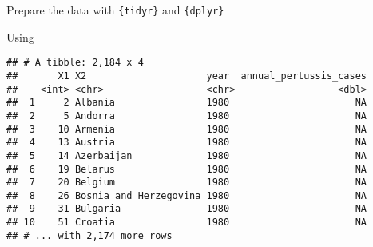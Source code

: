 \documentclass[ignorenonframetext,]{beamer}
\begin{document}
\begin{frame}[fragile]{Prepare the data with \texttt{\{tidyr\}} and
\texttt{\{dplyr\}}}
\begin{block}{Using \texttt{\textasciigrave{}}}
\begin{verbatim}
## # A tibble: 2,184 x 4
##       X1 X2                     year  annual_pertussis_cases
##    <int> <chr>                  <chr>                  <dbl>
##  1     2 Albania                1980                      NA
##  2     5 Andorra                1980                      NA
##  3    10 Armenia                1980                      NA
##  4    13 Austria                1980                      NA
##  5    14 Azerbaijan             1980                      NA
##  6    19 Belarus                1980                      NA
##  7    20 Belgium                1980                      NA
##  8    26 Bosnia and Herzegovina 1980                      NA
##  9    31 Bulgaria               1980                      NA
## 10    51 Croatia                1980                      NA
## # ... with 2,174 more rows
\end{verbatim}

\end{block}

\end{frame}
\end{document}
